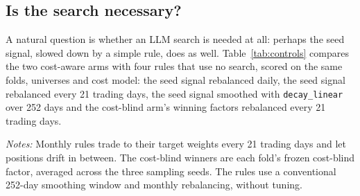 \documentclass[preprint,12pt,authoryear]{elsarticle}
\newcommand{\tablenote}[1]{\par\vspace{0.4em}\begin{minipage}{\linewidth}\footnotesize #1\end{minipage}}
\begin{document}
\subsection{Is the search necessary?}\label{sec:controls}

A natural question is whether an LLM search is needed at all: perhaps the seed signal, slowed down by a simple rule, does as well. Table~\ref{tab:controls} compares the two cost-aware arms with four rules that use no search, scored on the same folds, universes and cost model: the seed signal rebalanced daily, the seed signal rebalanced every 21 trading days, the seed signal smoothed with \texttt{decay\_linear} over 252 days and the cost-blind arm's winning factors rebalanced every 21 trading days.

\begin{table}[t]
\centering
\caption{Comparison with rules that use no search: out-of-sample net Sharpe ratio (Net SR) and daily turnover (TO), 2006--2026.}
\label{tab:controls}
\footnotesize
{}
\tablenote{\emph{Notes:} Monthly rules trade to their target weights every 21 trading days and let positions drift in between. The cost-blind winners are each fold's frozen cost-blind factor, averaged across the three sampling seeds. The rules use a conventional 252-day smoothing window and monthly rebalancing, without tuning.}
\end{table}
\end{document}
